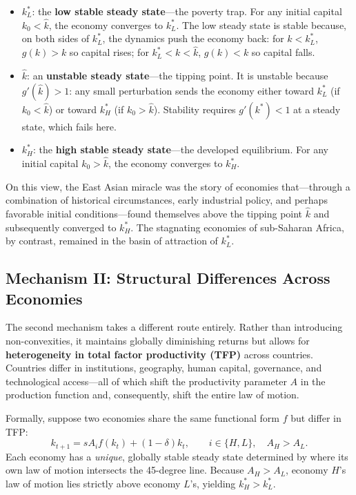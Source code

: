 \begin{itemize}
    \item $k_L^*$: the \textbf{low stable steady state}---the poverty trap. For any initial capital $k_0 < \hat{k}$, the economy converges to $k_L^*$. The low steady state is stable because, on both sides of $k_L^*$, the dynamics push the economy back: for $k < k_L^*$, $g(k) > k$ so capital rises; for $k_L^* < k < \hat{k}$, $g(k) < k$ so capital falls.
    \item $\hat{k}$: an \textbf{unstable steady state}---the tipping point. It is unstable because $g'(\hat{k}) > 1$: any small perturbation sends the economy either toward $k_L^*$ (if $k_0 < \hat{k}$) or toward $k_H^*$ (if $k_0 > \hat{k}$). Stability requires $g'(k^*) < 1$ at a steady state, which fails here.
    \item $k_H^*$: the \textbf{high stable steady state}---the developed equilibrium. For any initial capital $k_0 > \hat{k}$, the economy converges to $k_H^*$.
\end{itemize}

On this view, the East Asian miracle was the story of economies that---through a combination of historical circumstances, early industrial policy, and perhaps favorable initial conditions---found themselves above the tipping point $\hat{k}$ and subsequently converged to $k_H^*$. The stagnating economies of sub-Saharan Africa, by contrast, remained in the basin of attraction of $k_L^*$.

\subsection{Mechanism II: Structural Differences Across Economies}

The second mechanism takes a different route entirely. Rather than introducing non-convexities, it maintains globally diminishing returns but allows for \textbf{heterogeneity in total factor productivity (TFP)} across countries. Countries differ in institutions, geography, human capital, governance, and technological access---all of which shift the productivity parameter $A$ in the production function and, consequently, shift the entire law of motion.

Formally, suppose two economies share the same functional form $f$ but differ in TFP:
\[
k_{t+1} = s A_i f(k_t) + (1-\delta)k_t, \qquad i \in \{H, L\},\quad A_H > A_L.
\]
Each economy has a \textit{unique}, globally stable steady state determined by where its own law of motion intersects the 45-degree line. Because $A_H > A_L$, economy $H$'s law of motion lies strictly above economy $L$'s, yielding $k_H^* > k_L^*$.

